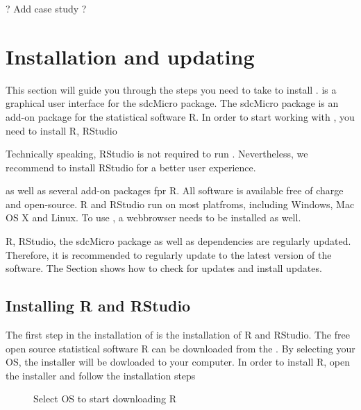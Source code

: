 \documentclass[letterpaper,10pt,english]{sphinxmanual}
\begin{document}
? Add case study ?


\chapter{Installation and updating}
\label{\detokenize{installation::doc}}\label{\detokenize{installation:installation-and-updating}}
This section will guide you through the steps you need to take to install .
 is a graphical user interface for the sdcMicro package.
The sdcMicro package is an add-on package for the statistical software R. In order
to start working with , you need to install R, RStudio %
\begin{footnote}[1]\sphinxAtStartFootnote
Technically speaking, RStudio is not required to run . Nevertheless, we recommend to install RStudio for a better user experience.
%
\end{footnote} as well as several add-on packages
fpr R. All software is available free of charge and open-source. R and RStudio run on
most platfroms, including Windows, Mac OS X and Linux. To use ,
a webbrowser needs to be installed as well.

R, RStudio, the sdcMicro package as well as dependencies are regularly updated. Therefore,
it is recommended to regularly update to the latest version of the software.
The Section {\hyperref[\detokenize{installation:updating-r-rstudio-and-the-sdcmicro-package}]{}} shows how to check for updates and install updates.


\section{Installing R and RStudio}
\label{\detokenize{installation:installing-r-and-rstudio}}
The first step in the installation of  is the installation of R and RStudio. The
free open source statistical software R can be downloaded from the .
By selecting your OS, the installer will be dowloaded to your computer. In order to install
R, open the installer and follow the installation steps

\begin{figure}[htbp]
\centering
\capstart

\noindent{}
\caption{Select OS to start downloading R}\label{\detokenize{installation:fig21}}\label{\detokenize{installation:id7}}\end{figure}
\end{document}

